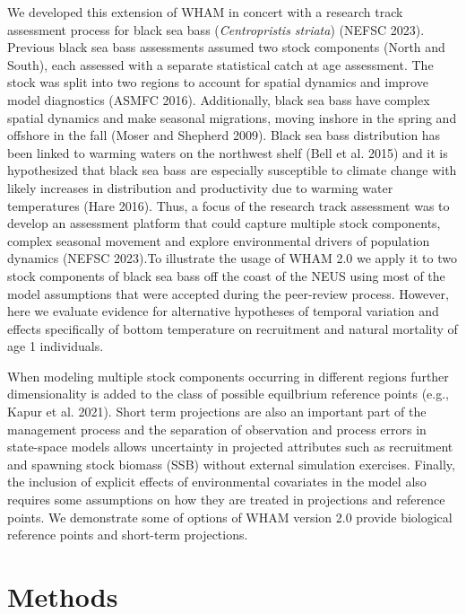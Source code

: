 \documentclass[
]{article}
\begin{document}
We developed this extension of WHAM in concert with a research track
assessment process for black sea bass (\textit{Centropristis striata})
(NEFSC 2023). Previous black sea bass assessments assumed two stock
components (North and South), each assessed with a separate statistical
catch at age assessment. The stock was split into two regions to account
for spatial dynamics and improve model diagnostics (ASMFC 2016).
Additionally, black sea bass have complex spatial dynamics and make
seasonal migrations, moving inshore in the spring and offshore in the
fall (Moser and Shepherd 2009). Black sea bass distribution has been
linked to warming waters on the northwest shelf (Bell et al. 2015) and
it is hypothesized that black sea bass are especially susceptible to
climate change with likely increases in distribution and productivity
due to warming water temperatures (Hare 2016). Thus, a focus of the
research track assessment was to develop an assessment platform that
could capture multiple stock components, complex seasonal movement and
explore environmental drivers of population dynamics (NEFSC 2023).To
illustrate the usage of WHAM 2.0 we apply it to two stock components of
black sea bass off the coast of the NEUS using most of the model
assumptions that were accepted during the peer-review process. However,
here we evaluate evidence for alternative hypotheses of temporal
variation and effects specifically of bottom temperature on recruitment
and natural mortality of age 1 individuals.

When modeling multiple stock components occurring in different regions
further dimensionality is added to the class of possible equilbrium
reference points (e.g., Kapur et al. 2021). Short term projections are
also an important part of the management process and the separation of
observation and process errors in state-space models allows uncertainty
in projected attributes such as recruitment and spawning stock biomass
(SSB) without external simulation exercises. Finally, the inclusion of
explicit effects of environmental covariates in the model also requires
some assumptions on how they are treated in projections and reference
points. We demonstrate some of options of WHAM version 2.0 provide
biological reference points and short-term projections.

\hypertarget{methods}{%
\section*{Methods}\label{methods}}
\end{document}
